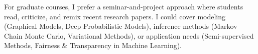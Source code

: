 \documentclass[11pt,letterpaper]{article}
\begin{document}
For graduate courses, I prefer a seminar-and-project approach where students read, criticize, and remix recent research papers. I could cover modeling (Graphical Models, Deep Probabilistic Models), inference methods (Markov Chain Monte Carlo, Variational Methods), or application needs (Semi-supervised Methods, Fairness \& Transparency in Machine Learning).

\end{document}
